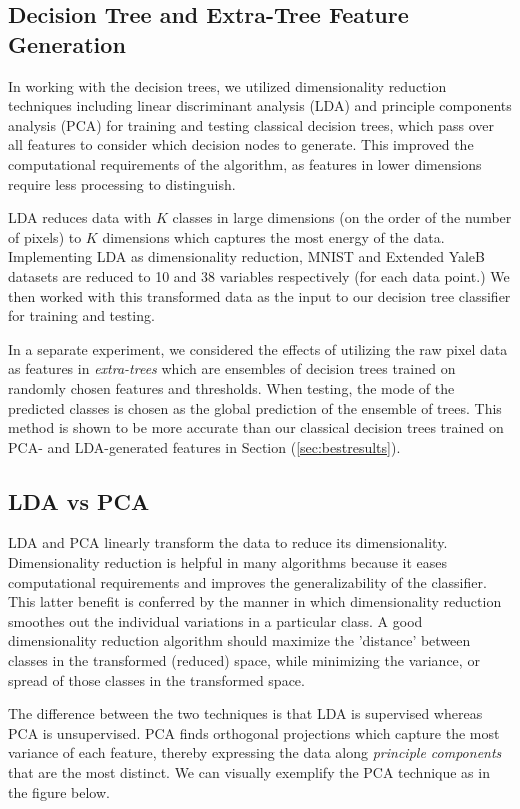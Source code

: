 \subsection{Decision Tree  and Extra-Tree Feature Generation}

In working with the decision trees, we utilized dimensionality reduction techniques including linear discriminant analysis (LDA) and principle components analysis (PCA) for training and testing classical decision trees, which pass over all features to consider which decision nodes to generate. This improved the computational requirements of the algorithm, as features in lower dimensions require less processing to distinguish.

LDA reduces data with $K$ classes in large dimensions (on the order of the number of pixels) to 
$K$ dimensions which captures the most energy of the data. Implementing LDA as dimensionality reduction, MNIST and Extended YaleB datasets are reduced to 10 and 38 variables respectively (for each data point.) We then worked with this transformed data as the input to our decision tree classifier for training and testing.

In a separate experiment, we considered the effects of utilizing the raw pixel data as features in \emph{extra-trees} which are ensembles of decision trees trained on randomly chosen features and thresholds. When testing, the mode of the predicted classes is chosen as the global prediction of the ensemble of trees. This method is shown to be more accurate than our classical decision trees trained on PCA- and LDA-generated features in Section (\ref{sec:bestresults}).

\subsection{LDA vs PCA}

LDA and PCA linearly transform the data to reduce its dimensionality. Dimensionality reduction is helpful in many algorithms because it eases computational requirements and improves the generalizability of the classifier. This latter benefit is conferred by the manner in which dimensionality reduction smoothes out the individual variations in a particular class. A good dimensionality reduction algorithm should maximize the 'distance' between classes in the transformed (reduced) space, while minimizing the variance, or spread of those classes in the transformed space. 

The difference between the two techniques is that LDA is supervised whereas PCA is unsupervised. PCA finds orthogonal projections which capture the most variance of each feature, thereby expressing the data along \emph{principle components} that are the most distinct. We can visually exemplify the PCA technique as in the figure below. 

